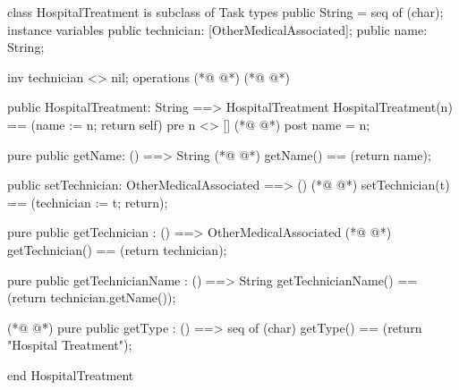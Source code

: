\begin{vdmpp}[breaklines=true]
class HospitalTreatment is subclass of Task
types
 public String = seq of (char);
instance variables
  public technician: [OtherMedicalAssociated];
  public name: String;
  
  inv technician <> nil;
operations
(*@
\label{HospitalTreatment:10}
@*)
(*@
\label{Hospital:10}
@*)

 public HospitalTreatment: String ==> HospitalTreatment
  HospitalTreatment(n) == (name := n; return self)
 pre n <> []
(*@
\label{getName:14}
@*)
 post name = n;
 
 pure public getName: () ==> String
(*@
\label{setTechnician:17}
@*)
  getName() == (return name);
  
 public setTechnician: OtherMedicalAssociated ==> ()
(*@
\label{getTechnician:20}
@*)
  setTechnician(t) == (technician := t; return);
 
 pure public getTechnician : () ==> OtherMedicalAssociated
(*@
\label{getTechnicianName:23}
@*)
  getTechnician() == (return technician);
  
 pure public getTechnicianName : () ==> String
  getTechnicianName() == (return technician.getName());
 
(*@
\label{getType:28}
@*)
 pure public getType : () ==> seq of (char) 
  getType() == (return "Hospital Treatment");

end HospitalTreatment
\end{vdmpp}
